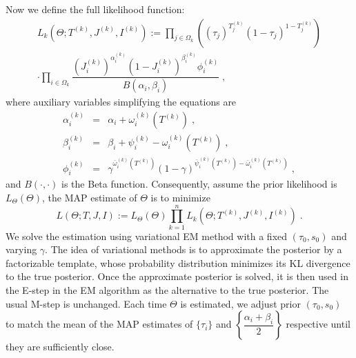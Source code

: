 \documentclass[10pt,journal,letterpaper,compsoc,twoside]{IEEEtran}
\newcommand{\assign}{:=}
\begin{document}
Now we define the full likelihood function:
\begin{multline}
  L_{k} ( \Theta ;T^{( k )} ,J^{( k )} ,I^{( k )} ) \assign  \prod_{j \in
  \Omega_{k}} \left( ( \tau_{j} )^{T_{j}^{( k )}} ( 1- \tau_{j} )^{1-T_{j}^{( k )}}
  \right)  \\ 
\cdot  \prod_{i \in \Omega_{k}} \dfrac{\left( J_{i}^{( k )}
  \right)^{\alpha_{i}^{( k )}} \left( 1-J_{i}^{( k )} \right)^{\beta_{i}^{( k )}} \phi_{i}^{( k
  )}}{B ( \alpha_{i} , \beta_{i} )} \;,\label{eq:likelihood}
\end{multline}
where auxiliary variables simplifying the equations are
\begin{eqnarray*}
\alpha_{i}^{( k )} &=& \alpha_{i} + \omega_{i}^{( k )} \left( T^{( k )} \right)\;,\\
\beta_{i}^{( k )} &=& \beta_{i} + \psi_{i}^{( k )} - \omega_{i}^{( k )} \left( T^{(
k )} \right)\;,\\
  \phi_{i}^{( k )} &=& \gamma^{\bar{\omega}_{i}^{( k )} \left( T^{( k )} \right)} ( 1-
  \gamma )^{\bar{\psi}_{i}^{( k )}\left( T^{( k )} \right) - \bar{\omega}_{i}^{( k )} \left(
  T^{( k )} \right)} \;,
\end{eqnarray*}
and $B ( \cdot , \cdot )$ is the Beta function. Consequently, 
assume the prior likelihood is $L_{\Theta}(\Theta)$, the 
MAP estimate of $\Theta$ is to minimize 
\begin{equation}
  L ( \Theta ;T,J,I ) \assign L_{\Theta}(\Theta) \prod_{k=1}^{n} L_{k} ( \Theta ;T^{( k )} ,J^{(
  k )} ,I^{( k )} )\;.
\end{equation}
We solve the estimation using variational EM method with a fixed $(\tau_0, s_0)$ and varying $\gamma$.
The idea of variational methods is to approximate the posterior by a factorizable
template, whose probability distribution minimizes its KL divergence to the
true posterior. Once the approximate posterior is solved, it is then used in
the E-step in the EM algorithm as the alternative to the true posterior. The
usual M-step is unchanged. Each time $\Theta$ is estimated,
we adjust prior $(\tau_0, s_0)$ to match the mean of the MAP estimates
of $\{\tau_i\}$ and $\left\{\dfrac{\alpha_i + \beta_i}{2}\right\}$ respective 
until they are sufficiently close.
\end{document}
